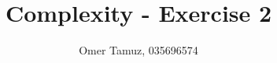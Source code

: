 \documentclass[11pt]{article} \usepackage{amssymb}
\begin{document}
\title{Complexity - Exercise 2}

 \author{Omer Tamuz, 035696574}
\maketitle


\end{document}
